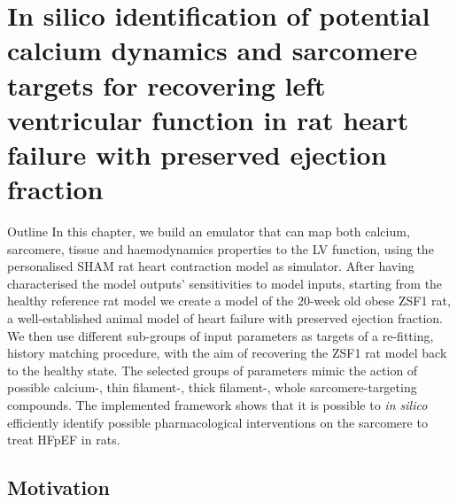 \chapter{In silico identification of potential calcium dynamics and sarcomere targets for recovering left ventricular function in rat heart failure with preserved ejection fraction}\label{cha:chapter7}
%
%
%
\begin{remark}{Outline}
    In this chapter, we build an emulator that can map both calcium, sarcomere, tissue and haemodynamics properties to the LV function, using the personalised SHAM rat heart contraction model as simulator. After having characterised the model outputs' sensitivities to model inputs, starting from the healthy reference rat model we create a model of the $20$-week old obese ZSF1 rat, a well-established animal model of heart failure with preserved ejection fraction. We then use different sub-groups of input parameters as targets of a re-fitting, history matching procedure, with the aim of recovering the ZSF1 rat model back to the healthy state. The selected groups of parameters mimic the action of possible calcium-, thin filament-, thick filament-, whole sarcomere-targeting compounds. The implemented framework shows that it is possible to \textit{in silico} efficiently identify possible pharmacological interventions on the sarcomere to treat HFpEF in rats.
\end{remark}


%
%
%
\section{Motivation}\label{sec:ch7motivation}

